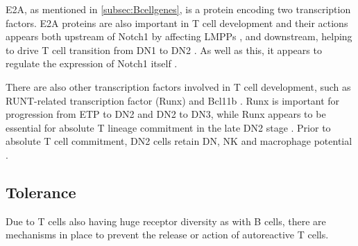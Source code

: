 E2A, as mentioned in \cref{subsec:Bcellgenes}, is a protein encoding two transcription factors.
E2A proteins are also important in T cell development and their actions appears both upstream of Notch1 by affecting LMPPs \citep{Dias2008}, and downstream, helping to drive T cell transition from DN1 to DN2 \citep{Naito2011}.
As well as this, it appears to regulate the expression of Notch1 itself \citep{Dias2008}.

There are also other transcription factors involved in T cell development, such as RUNT-related transcription factor (Runx) and Bcl11b \citep{Naito2011, Liu2010}.
Runx is important for progression from ETP to DN2 and DN2 to DN3, while Runx appears to be essential for absolute T lineage commitment in the late DN2 stage \citep{Liu2010, Naito2011}. 
Prior to absolute T cell commitment, DN2 cells retain DN, NK and macrophage potential \citep{Naito2011}.






\subsection{Tolerance}
\label{subsec:Tcelltolerance}

Due to T cells also having huge receptor diversity as with B cells, there are mechanisms in place to prevent the release or action of autoreactive T cells.

